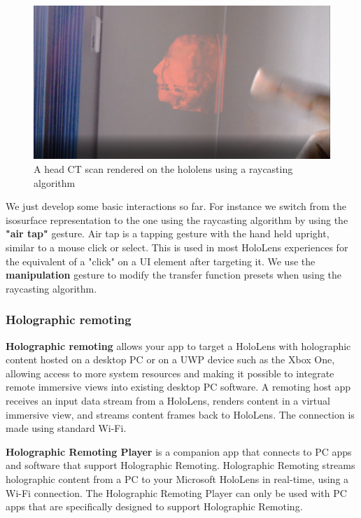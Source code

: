 \begin{figure}
\centering
\includegraphics [width=\textwidth]{Figures/mixedray}
\caption{A head CT scan rendered on the hololens using a raycasting algorithm }
\label{fig:mixedray}
\end{figure}

We just develop some basic interactions so far. For instance we switch from the isosurface representation to the one using the raycasting algorithm by using the \textbf{"air tap"} gesture. Air tap is a tapping gesture with the hand held upright, similar to a mouse click or select. This is used in most HoloLens experiences for the equivalent of a "click" on a UI element after targeting it.  We use the \textbf{manipulation} gesture to modify the transfer function presets when using the raycasting algorithm.

\subsubsection{ Holographic remoting }

\textbf {Holographic remoting } allows your app to target a HoloLens with holographic content hosted on a desktop PC or on a UWP device such as the Xbox One, allowing access to more system resources and making it possible to integrate remote immersive views into existing desktop PC software. A remoting host app receives an input data stream from a HoloLens, renders content in a virtual immersive view, and streams content frames back to HoloLens. The connection is made using standard Wi-Fi. 

\textbf {Holographic Remoting Player} is a companion app that connects to PC apps and software that support Holographic Remoting. Holographic Remoting streams holographic content from a PC to your Microsoft HoloLens in real-time, using a Wi-Fi connection. The Holographic Remoting Player can only be used with PC apps that are specifically designed to support Holographic Remoting.

